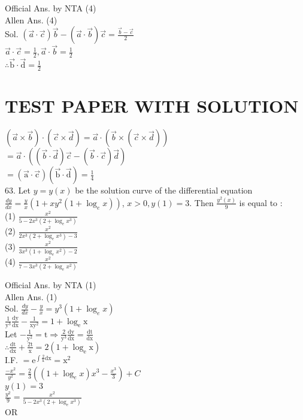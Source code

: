 \documentclass[10pt]{article}
\begin{document}
Official Ans. by NTA (4)\\
Allen Ans. (4)\\
Sol. \((\vec{a} \cdot \vec{c}) \vec{b}-(\vec{a} \cdot \vec{b}) \vec{c}=\frac{\vec{b}-\vec{c}}{2}\)\\
\(\vec{a} \cdot \vec{c}=\frac{1}{2}, \vec{a} \cdot \vec{b}=\frac{1}{2}\)\\
\(\therefore \overrightarrow{\mathrm{b}} \cdot \overrightarrow{\mathrm{d}}=\frac{1}{2}\)

\section*{TEST PAPER WITH SOLUTION}
\((\vec{a} \times \vec{b}) \cdot(\vec{c} \times \vec{d})=\vec{a} \cdot(\vec{b} \times(\vec{c} \times \vec{d}))\)\\
\(=\vec{a} \cdot((\vec{b} \cdot \vec{d}) \vec{c}-(\vec{b} \cdot \vec{c}) \vec{d})\)\\
\(=(\overrightarrow{\mathrm{a}} \cdot \overrightarrow{\mathrm{c}})(\overrightarrow{\mathrm{b}} \cdot \overrightarrow{\mathrm{d}})=\frac{1}{4}\)\\
63. Let \(y=y(x)\) be the solution curve of the differential equation \(\frac{d y}{d x}=\frac{y}{x}\left(1+x y^{2}\left(1+\log _{e} x\right)\right)\), \(x>0, y(1)=3\). Then \(\frac{y^{2}(x)}{9}\) is equal to :\\
(1) \(\frac{x^{2}}{5-2 x^{3}\left(2+\log _{e} x^{3}\right)}\)\\
(2) \(\frac{x^{2}}{2 x^{3}\left(2+\log _{e} x^{3}\right)-3}\)\\
(3) \(\frac{x^{2}}{3 x^{3}\left(1+\log _{e} x^{2}\right)-2}\)\\
(4) \(\frac{x^{2}}{7-3 x^{3}\left(2+\log _{e} x^{2}\right)}\)

Official Ans. by NTA (1)\\
Allen Ans. (1)\\
Sol. \(\frac{d y}{d x}-\frac{y}{x}=y^{3}\left(1+\log _{e} x\right)\)\\
\(\frac{1}{\mathrm{y}^{3}} \frac{\mathrm{dy}}{\mathrm{dx}}-\frac{1}{\mathrm{xy}^{2}}=1+\log _{\mathrm{e}} \mathrm{x}\)\\
Let \(-\frac{1}{\mathrm{y}^{2}}=\mathrm{t} \Rightarrow \frac{2}{\mathrm{y}^{3}} \frac{\mathrm{dy}}{\mathrm{dx}}=\frac{\mathrm{dt}}{\mathrm{dx}}\)\\
\(\therefore \frac{\mathrm{dt}}{\mathrm{dx}}+\frac{2 \mathrm{t}}{\mathrm{x}}=2\left(1+\log _{\mathrm{e}} \mathrm{x}\right)\)\\
I.F. \(=\mathrm{e}^{\int \frac{2}{\mathrm{x}} \mathrm{dx}}=\mathrm{x}^{2}\)\\
\(\frac{-x^{2}}{y^{2}}=\frac{2}{3}\left(\left(1+\log _{e} x\right) x^{3}-\frac{x^{3}}{3}\right)+C\)\\
\(y(1)=3\)\\
\(\frac{y^{2}}{9}=\frac{x^{2}}{5-2 x^{3}\left(2+\log _{e} x^{3}\right)}\)\\
OR
\end{document}
